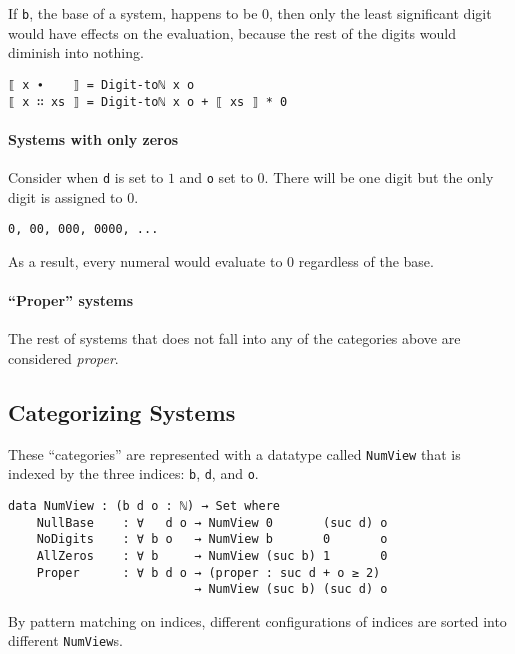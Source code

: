 \documentclass[\main/thesis.tex]{subfiles}
\begin{document}
If {\lstinline|b|}, the base of a system, happens to be $ 0 $,
then only the least significant digit would have effects on the evaluation,
because the rest of the digits would diminish into nothing.

\begin{lstlisting}
⟦ x ∙    ⟧ = Digit-toℕ x o
⟦ x ∷ xs ⟧ = Digit-toℕ x o + ⟦ xs ⟧ * 0
\end{lstlisting}

\paragraph{Systems with only zeros}

Consider when {\lstinline|d|} is set to $ 1 $ and {\lstinline|o|} set to $ 0 $.
There will be one digit but the only digit is assigned to $ 0 $.

\begin{lstlisting}
0, 00, 000, 0000, ...
\end{lstlisting}

As a result, every numeral would evaluate to $ 0 $ regardless of the base.

\paragraph{``Proper'' systems}

The rest of systems that does not fall into any of the categories above
are considered \textit{proper}.

\subsection{Categorizing Systems}

These ``categories'' are represented with a datatype called {\lstinline|NumView|}
that is indexed by the three indices: {\lstinline|b|}, {\lstinline|d|}, and {\lstinline|o|}.

\begin{lstlisting}
data NumView : (b d o : ℕ) → Set where
    NullBase    : ∀   d o → NumView 0       (suc d) o
    NoDigits    : ∀ b o   → NumView b       0       o
    AllZeros    : ∀ b     → NumView (suc b) 1       0
    Proper      : ∀ b d o → (proper : suc d + o ≥ 2)
                          → NumView (suc b) (suc d) o
\end{lstlisting}

By pattern matching on indices, different configurations of indices are sorted into
different {\lstinline|NumView|}s.
\end{document}
